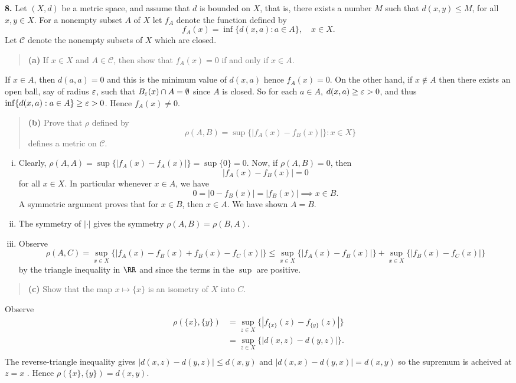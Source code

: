 \documentclass{homework}
\begin{document}
{\bf 8.} Let $(X,d)$ be a metric space, and assume that $d$ is bounded on $X$, that is, there exists a number $M$ such that $d(x,y) \le M$, for all $x,y \in X$.  For a nonempty subset $A$ of $X$ let $f_A$ denote the function defined by
$$
  f_A(x) = \inf\{d(x,a):a\in A\},\quad x\in X.
$$
Let $\mathcal C$ denote the nonempty subsets of $X$ which are closed.
\begin{quote}
  {\bf (a)} If $x\in X$ and $A\in\mathcal C$, then show that $f_A(x) = 0$ if and only if $x\in A$.
\end{quote}
\begin{solution}
  If $x\in A$, then $d(a,a) = 0$ and this is the minimum value of $d(x,a)$ hence $f_A(x) = 0$.  On the other hand, if $x\not\in A$ then there exists an open ball, say of radius $\varepsilon$, such that $B_\varepsilon(x)\cap A = \emptyset$ since $A$ is closed. So for each $a \in A$, $d(x,a) \ge \varepsilon > 0$, and thus $\inf\{d(x,a):a\in A\} \ge \varepsilon > 0$. Hence $f_A(x) \not=0$.
\end{solution}

\begin{quote}
  {\bf (b)} Prove that $\rho$ defined by 
  $$
    \rho(A,B) = \sup\{|f_A(x) - f_B(x)|\} :x\in X\}
  $$
  defines a metric on $\mathcal C$.
\end{quote}
\begin{solution}
\begin{enumerate}[i)]
  \item Clearly, $\rho(A,A) = \sup\{|f_A(x) - f_A(x)|\} = \sup\{0\} = 0$.  Now, if $\rho(A,B) = 0$, then 
  $$
    |f_A(x) - f_B(x)| = 0
  $$ 
  for all $x\in X$. In particular whenever $x\in A$, we have
  $$
    0 = |0 - f_B(x)| = |f_B(x)| \implies x\in B.
  $$
  A symmetric argument proves that for $x\in B$, then $x\in A$.  We have shown $A=B$.
  \item The symmetry of $|\cdot|$ gives the symmetry $\rho(A,B) = \rho(B,A)$.
  \item Observe
  $$
    \rho(A,C) = \sup_{x\in X}\{|f_A(x) - f_B(x) + f_B(x) - f_C(x)|\} \le \sup_{x\in X}\{|f_A(x) - f_B(x)|\} + \sup_{x\in X}\{|f_B(x) - f_C(x)|\}
  $$
  by the triangle inequality in $\RR$ and since the terms in the $\sup$ are positive.
\end{enumerate}
\end{solution}

\begin{quote}
  {\bf (c)} Show that the map $x\mapsto \{x\}$ is an isometry of $X$ into $C$.
\end{quote}
\begin{solution}
  Observe
  \begin{align*}
    \rho(\{x\},\{y\}) 
    &= \sup_{z\in X} \{|f_{\{x\}}(z) - f_{\{y\}}(z)|\}\\
    &= \sup_{z\in X} \{|d(x,z) - d(y,z)|\}.\\
  \end{align*}
  The reverse-triangle inequality gives $|d(x,z) - d(y,z)| \le d(x,y)$ and $|d(x,x) - d(y,x)| = d(x,y)$ so the supremum is acheived at $z=x$
  .  Hence $\rho(\{x\},\{y\}) = d(x,y)$.
\end{solution}
\end{document}

